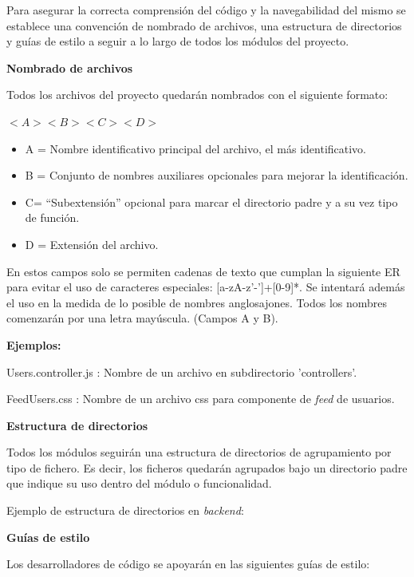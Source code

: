 \documentclass{article}
\begin{document}
Para asegurar la correcta comprensión del código y la navegabilidad del mismo se establece una convención de nombrado de archivos, una estructura de directorios y guías de estilo a seguir a lo largo de todos los 
módulos del proyecto.

\textbf{Nombrado de archivos}

Todos los archivos del proyecto quedarán nombrados con el siguiente formato:

$<A><B><C><D>$

\begin{itemize}
    \setlength{\itemsep}{0em} %
    \item A = Nombre identificativo principal del archivo, el más identificativo.
    \item B = Conjunto de nombres auxiliares opcionales para mejorar la identificación.
    \item C= “Subextensión” opcional para marcar el directorio padre y a su vez tipo de función.
    \item D = Extensión del archivo.
\end{itemize}

En estos campos solo se permiten cadenas de texto que cumplan la siguiente ER para evitar el uso de  caracteres especiales: [a-zA-z'-']+[0-9]*. Se intentará además el uso en la medida de lo posible de nombres anglosajones. Todos los nombres comenzarán por una letra mayúscula. (Campos A y B).

\textbf{Ejemplos:} 

Users.controller.js : Nombre de un archivo en subdirectorio 'controllers'.

FeedUsers.css :  Nombre de un archivo css para componente de \textit{feed} de usuarios.
\pagebreak

\textbf{Estructura de directorios}

Todos los módulos seguirán una estructura de directorios de agrupamiento por tipo de fichero. Es decir, los ficheros quedarán agrupados bajo un directorio padre que indique su uso dentro del módulo o funcionalidad.

Ejemplo de estructura de directorios en \textit{backend}:


\textbf{Guías de estilo}

Los desarrolladores de código se apoyarán en las siguientes guías de estilo:
\end{document}
